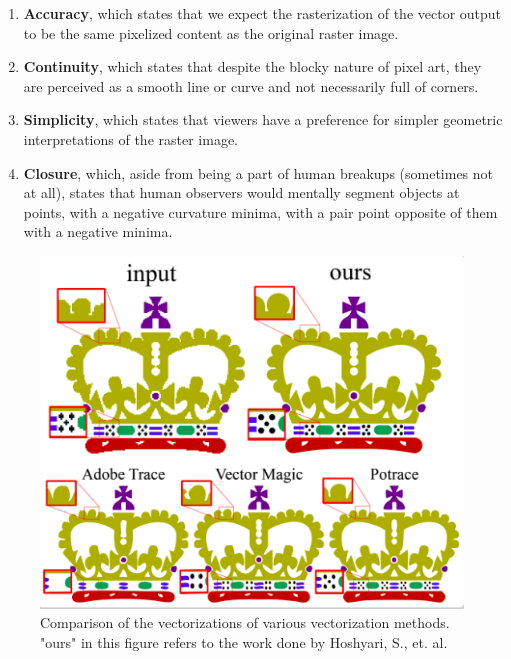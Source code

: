 \begin{enumerate}
	\item \textbf{Accuracy}, which states that we expect the rasterization of the vector output to be the same pixelized content as the original raster image.

    \item \textbf{Continuity}, which states that despite the blocky nature of pixel art, they are perceived as a smooth line or curve and not necessarily full of corners.

    \item \textbf{Simplicity}, which states that viewers have a preference for simpler geometric interpretations of the raster image.

    \item \textbf{Closure}, which, aside from being a part of human breakups (sometimes not at all), states that human observers would mentally segment objects at points, with a negative curvature minima, with a pair point opposite of them with a negative minima.
\end{enumerate}

\begin{figure}[h]
	\centering
	\includegraphics[scale=0.75]{images/chap02-rrl/hoshyari.png}
	\caption{Comparison of the vectorizations of various vectorization methods. "ours" in this figure refers to the work done by Hoshyari, S., et. al.}
	\label{fig:hohsyari-result}
\end{figure}

